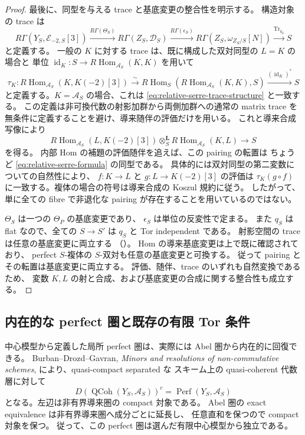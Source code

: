 \begin{proof}
最後に、同型を与える trace と基底変更の整合性を明示する。
構造対象の trace は
\begin{equation}\label{eq:relative-serre-trace-structure}
 R\Gamma(Y_S,\mathscr E_{-2,S}[3])
 \xrightarrow{R\Gamma(\Theta_S)}
 R\Gamma(Z_S,\mathscr D_S)
 \xrightarrow{R\Gamma(\epsilon_S)}
 R\Gamma(Z_S,\omega_{Z_S/S}[N])
 \xrightarrow{\operatorname{Tr}_{q_S}} S
\end{equation}
と定義する。
一般の $K$ に対する trace は、既に構成した双対同型の $L=K$ の場合と
単位 $\operatorname{id}_K:S\to R\operatorname{Hom}_{\mathscr A_S}(K,K)$ を用いて
\[
 \tau_K:R\operatorname{Hom}_{\mathscr A_S}(K,K(-2)[3])
 \xrightarrow{\sim}
 R\operatorname{Hom}_S
  (R\operatorname{Hom}_{\mathscr A_S}(K,K),S)
 \xrightarrow{(\operatorname{id}_K)^*}S
\]
と定義する。$K=\mathscr A_S$ の場合、これは
\eqref{eq:relative-serre-trace-structure} と一致する。
この定義は非可換代数の射影加群から両側加群への通常の matrix trace を
無条件に定義することを避け、導来随伴の評価だけを用いる。
これと導来合成写像により
\[
 R\operatorname{Hom}_{\mathscr A_S}(L,K(-2)[3])
 \otimes_S^{\mathbf L}
 R\operatorname{Hom}_{\mathscr A_S}(K,L)
 \longrightarrow S
\]
を得る。
内部 Hom の補題の評価随伴を追えば、この pairing の転置は
ちょうど \eqref{eq:relative-serre-formula} の同型である。
具体的には双対同型の第二変数についての自然性により、
$f:K\to L$ と $g:L\to K(-2)[3]$ の評価は
$\tau_K(g\circ f)$ に一致する。複体の場合の符号は導来合成の Koszul 規約に従う。
したがって、単に全ての fibre で非退化な pairing が存在することを用いているのではない。

$\Theta_S$ は一つの $\Theta_P$ の基底変更であり、
$\epsilon_S$ は単位の反変性で定まる。
また $q_S$ は flat なので、全ての $S\to S'$ は $q_S$ と Tor independent である。
射影空間の trace は任意の基底変更に両立する
（\cite[Lemma~48.7.1, Remark~48.12.5]{StacksRelativeDuality}）。
Hom の導来基底変更は上で既に確認されており、
perfect $S$-複体の $S$-双対も任意の基底変更と可換する。
従って pairing とその転置は基底変更に両立する。
評価、随伴、trace のいずれも自然変換であるため、
変数 $K,L$ の射と合成、および基底変更の合成に関する整合性も成立する。
\end{proof}

\subsection{内在的な perfect 圏と既存の有限 Tor 条件}

中心模型から定義した局所 perfect 圏は、実際には Abel 圏から内在的に回復できる。
Burban--Drozd--Gavran, \emph{Minors and resolutions of non-commutative schemes},
\cite[Definition~3.13, Theorem~3.14]{BDGMinors}により、quasi-compact separated な
スキーム上の quasi-coherent 代数層に対して
\[
 D(\operatorname{QCoh}(Y_S,\mathscr A_S))^c
 =\operatorname{Perf}(Y_S,\mathscr A_S)
\]
となる。左辺は非有界導来圏の compact 対象である。
Abel 圏の exact equivalence は非有界導来圏へ成分ごとに延長し、
任意直和を保つので compact 対象を保つ。
従って、この perfect 圏は選んだ有限中心模型から独立である。

